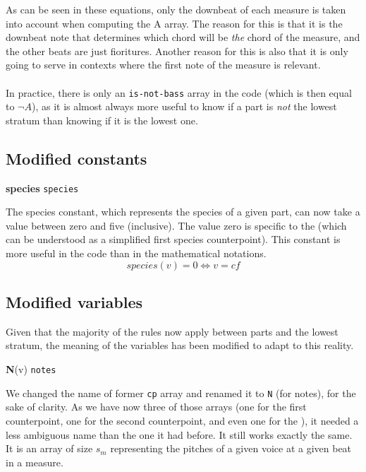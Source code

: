 As can be seen in these equations, only the downbeat of each measure is taken into account when computing the A array. The reason for this is that it is the downbeat note that determines which chord will be \textit{the} chord of the measure, and the other beats are just fioritures. Another reason for this is also that it is only going to serve in contexts where the first note of the measure is relevant.

\paragraph{}
In practice, there is only an \texttt{is-not-bass} array in the code (which is then equal to $\neg A$), as it is almost always more useful to know if a part is \textit{not} the lowest stratum than knowing if it is the lowest one. 

\subsection{Modified constants} \label{subsection:modified_constants}
\noindent \textbf{species} \hspace{.2cm} \texttt{species} 

The species constant, which represents the species of a given part, can now take a value between zero and five (inclusive). The value zero is specific to the \cfs (which can be understood as a simplified first species counterpoint). This constant is more useful in the code than in the mathematical notations.
\begin{equation}
species(v) = 0 \iff v = cf
\end{equation}

\subsection{Modified variables} \label{subsection:modified_variables}
Given that the majority of the rules now apply between parts and the lowest stratum, the meaning of the variables has been modified to adapt to this reality. 

\vspace{.5cm} \noindent \textbf{N}(v) \hspace{.2cm} \texttt{notes} 

We changed the name of former \texttt{cp} array and renamed it to \texttt{N} (for notes), for the sake of clarity. As we have now three of those arrays (one for the first counterpoint, one for the second counterpoint, and even one for the \cf), it needed a less ambiguous name than the one it had before.
It still works exactly the same. It is an array of size $s_m$ representing the pitches of a given voice at a given beat in a measure.



